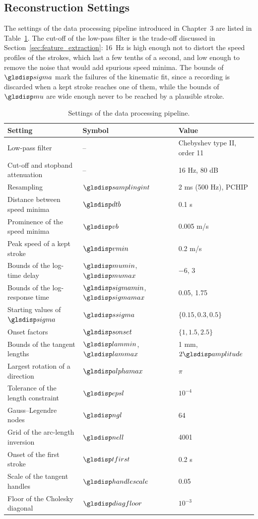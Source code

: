 \documentclass[12pt]{report}
\begin{document}
\subsection{Reconstruction Settings}
The settings of the data processing pipeline introduced in Chapter~3 are listed in Table~\ref{tab:reconstruction_settings}. The cut-off of the low-pass filter is the trade-off discussed in Section~\ref{sec:feature_extraction}: 16~Hz is high enough not to distort the speed profiles of the strokes, which last a few tenths of a second, and low enough to remove the noise that would add spurious speed minima. The bounds of $\sym{sigma}$ mark the failures of the kinematic fit, since a recording is discarded when a kept stroke reaches one of them, while the bounds of $\sym{mu}$ are wide enough never to be reached by a plausible stroke.

\begin{table}[htbp]
    \centering
    \caption{Settings of the data processing pipeline.}
    \label{tab:reconstruction_settings}
    \begin{tabular}{lll}
        \toprule
        Setting & Symbol & Value\\
        \midrule
        Low-pass filter & -- & Chebyshev type II, order 11\\
        Cut-off and stopband attenuation & -- & 16 Hz, 80 dB\\
        Resampling & $\sym{samplingint}$ & 2 ms (500 Hz), PCHIP\\
        Distance between speed minima & $\sym{dtb}$ & 0.1 s\\
        Prominence of the speed minima & $\sym{vb}$ & 0.005 m/s\\
        Peak speed of a kept stroke & $\sym{vmin}$ & 0.2 m/s\\
        Bounds of the log-time delay & $\sym{mumin}$, $\sym{mumax}$ & $-6$, $3$\\
        Bounds of the log-response time & $\sym{sigmamin}$, $\sym{sigmamax}$ & 0.05, 1.75\\
        Starting values of $\sym{sigma}$ & $\sym{ssigma}$ & $\{0.15,0.3,0.5\}$\\
        Onset factors & $\sym{sonset}$ & $\{1,1.5,2.5\}$\\
        Bounds of the tangent lengths & $\sym{lammin}$, $\sym{lammax}_i$ & 1 mm, $2\sym{amplitude}_i$\\
        Largest rotation of a direction & $\sym{alphamax}$ & $\pi$\\
        Tolerance of the length constraint & $\sym{epsl}$ & $10^{-4}$\\
        Gauss--Legendre nodes & $\sym{ngl}$ & 64\\
        Grid of the arc-length inversion & $\sym{nell}$ & 4001\\
        Onset of the first stroke & $\sym{tfirst}$ & 0.2 s\\
        Scale of the tangent handles & $\sym{handlescale}$ & 0.05\\
        Floor of the Cholesky diagonal & $\sym{diagfloor}$ & $10^{-3}$\\
        \bottomrule
    \end{tabular}
\end{table}
\end{document}
